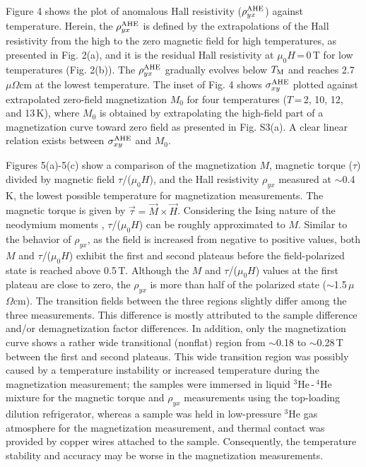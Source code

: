 \documentclass[%
preprint,
 amsmath,amssymb,
 aps,
]{revtex4-2}
\begin{document}
%
Figure 4 shows the plot of anomalous Hall resistivity ($\rho_{yx}^{\rm AHE}$) against temperature. 
%
Herein, the $\rho_{yx}^{\rm AHE}$ is defined by the extrapolations of the Hall resistivity 
from the high to the zero magnetic field for high temperatures, as presented in Fig. 2(a), 
and it is the residual Hall resistivity at $\mu_{0}H$\,=\,0\,T for low temperatures (Fig. 2(b)). 
%
The $\rho_{yx}^{\rm AHE}$ gradually evolves below $T_{\rm M}$ and reaches 2.7\,$\mu\Omega$cm 
at the lowest temperature. 
%
The inset of Fig. 4 shows $\sigma_{xy}^{\rm AHE}$ plotted against extrapolated zero-field magnetization 
$M_{0}$ for four temperatures ($T$\,=\,2, 10, 12, and 13\,K), where $M_{0}$ is obtained by 
extrapolating the high-field part of a magnetization curve toward zero field as presented in Fig. S3(a). 
A clear linear relation exists between $\sigma_{xy}^{\rm AHE}$ and $M_{0}$. 
%

Figures 5(a)-5(c) show a comparison of the magnetization $M$, magnetic torque ($\tau$) 
divided by magnetic field $\tau$/($\mu_{0}H$), and the Hall resistivity $\rho_{yx}$ measured 
at $\sim$0.4\,K, the lowest possible temperature for magnetization measurements. 
%
The magnetic torque is given by $\vec{\tau} = \vec{M} \times \vec{H}$. 
%
Considering the Ising nature of the neodymium moments 
\cite{Zhao_NewJPhys_2022,Yang_PhysRevMater_2023,Cho_SSRN_2022,Dhital_PhyrevB_2023,Kikugawa_inorganics_2023}, 
$\tau$/($\mu_{0}H$) can be roughly approximated to $M$. 
%
Similar to the behavior of $\rho_{yx}$, 
as the field is increased from negative to positive values, both $M$ and $\tau$/($\mu_{0}H$) exhibit 
the first and second plateaus before the field-polarized state is reached above 0.5\,T. 
%
Although the $M$ and $\tau$/($\mu_{0}H$) values at the first plateau are close to zero, 
the $\rho_{yx}$ is more than half of the polarized state ($\sim$1.5\,$\mu$$\Omega$cm). 
%
The transition fields between the three regions slightly differ among the three measurements. 
%
This difference is mostly attributed to the sample difference and/or demagnetization factor differences. 
%
In addition, only the magnetization curve shows a rather wide transitional (nonflat) region 
from $\sim$0.18 to $\sim$0.28\,T between the first and second plateaus. 
%
This wide transition region was possibly caused by a temperature instability or increased temperature 
during the magnetization measurement; the samples were immersed in liquid $^{3}$He\,-\,$^{4}$He 
mixture for the magnetic torque and $\rho_{yx}$ measurements 
using the top-loading dilution refrigerator, 
whereas a sample was held in low-pressure $^{3}$He gas atmosphere 
for the magnetization measurement, 
and thermal contact was provided by copper wires attached to the sample. 
%
Consequently, the temperature stability and accuracy may be worse 
in the magnetization measurements. 
%
\end{document}
